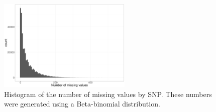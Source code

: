 \documentclass{bioinfo}
\begin{document}
\begin{figure}[!tpb]
\centerline{\includegraphics[width=180pt]{hist-NA}}
\caption{Histogram of the number of missing values by SNP. These numbers were generated using a Beta-binomial distribution.}\label{fig:NA}
\end{figure}
\end{document}

